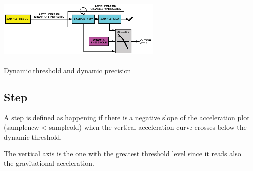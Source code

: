 \documentclass[a4paper,10pt]{article}
\makeatletter
\newenvironment{figurehere}{\def\@captype{figure}\vspace{2ex}}{\vspace{2ex}}
\makeatother
\begin{document}
\begin{multicols}{2}
\begin{figurehere}
 \centering
 \includegraphics[width=8cm, height=3cm]{./eps/RegistersDiagram.eps}
 \caption{Dynamic threshold and dynamic precision}
 \label{fig:RegistersDiagram}
\end{figurehere}

\subsection{Step}

A step is defined as happening if there is a negative slope of the acceleration plot (sample\textunderscore new < sample\textunderscore old) when the vertical acceleration curve crosses below the dynamic threshold.

The vertical axis is the one with the greatest threshold level since it reads also the gravitational acceleration.




\end{multicols}
\end{document}
